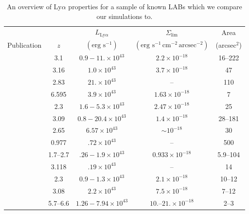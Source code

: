 \begin{table}
\caption{An overview of Ly$\alpha$ properties for a sample of known LABs which we compare our simulations to.}
\centering
\begin{tabular}{ | l | c | c | c | c | }
\hline
     & & $L_{\text{Ly}\alpha}$ & $\Sigma_\text{lim}$ & Area \\
    Publication & $z$ & $(\text{erg\ s}^{-1})$ & $(\text{erg\ s}^{-1}\,\text{cm}^{-2}\,\text{arcsec}^{-2})$ & (arcsec$^{2}$) \\
\hline

\citet{Matsuda2004} & 3.1 & $0.9 - 11.\times10^{43}$ & $2.2\times10^{-18}$ & 16--222\\
\hline

\citet{Nilsson2006} & 3.16 & $1.0 \times 10^{43}$ & $3.7\times10^{-18}$ & 47 \\
\hline

\citet{Smith2007} & 2.83 & $21.\times10^{43}$ & -- & 110\\
\hline

\citet{Ouchi2009} & 6.595 & $3.9\times10^{43}$ & $1.63\times10^{-18}$ & 7 \\
\hline

\citet{Yang2009} & 2.3 & $1.6 - 5.3\times10^{43}$ & $2.47\times10^{-18}$ & 25 \\
\hline

\citet{Matsuda2011} & 3.09 & $0.8-20.4 \times10^{43}$ & $1.4\times10^{-18}$ & 28--181\\
\hline

\citet{Steidel2011} & 2.65 & $6.57\times10^{43}$ & $\sim10^{-18}$ & 30 \\
\hline

\citet{Barger2012} & 0.977 & $.72\times10^{43}$ & -- & 500 \\
\hline

\citet{Prescott2013} & 1.7--2.7 & $.26 - 1.9\times10^{43}$ & $0.933\times10^{-18}$ & 5.9--104 \\
\hline

\citet{Caminha2016} & 3.118 & $.19\times10^{43}$ & -- & 14 \\
\hline

\citet{Badescu2017} & 2.3 & $0.9-1.3\times10^{43}$ & $2.1\times10^{-18}$ & 10--12 \\
\hline

\citet{North2017} & 3.08 & $2.2\times10^{43}$ & $7.5\times10^{-18}$ & 7--12\\
\hline

\citet{Shibuya2017} & 5.7--6.6 & $1.26 - 7.94\times10^{43}$ & $10.$--$21.\times10^{-18}$ & 2--3\\
\hline

\end{tabular}
\label{table:labs}
\end{table}

